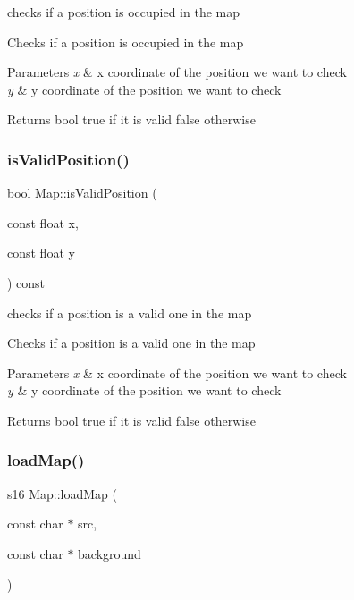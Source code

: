 checks if a position is occupied in the map 

Checks if a position is occupied in the map


\begin{DoxyParams}{Parameters}
{\em x} & x coordinate of the position we want to check \\
\hline
{\em y} & y coordinate of the position we want to check \\
\hline
\end{DoxyParams}
\begin{DoxyReturn}{Returns}
bool true if it is valid false otherwise 
\end{DoxyReturn}
\mbox{\label{class_map_a5b5c0989800c44a2db7a00bbf40c74a6}} 
\subsubsection{\texorpdfstring{is\+Valid\+Position()}{isValidPosition()}}
{\footnotesize\ttfamily bool Map\+::is\+Valid\+Position (\begin{DoxyParamCaption}\item[{const float}]{x,  }\item[{const float}]{y }\end{DoxyParamCaption}) const}



checks if a position is a valid one in the map 

Checks if a position is a valid one in the map


\begin{DoxyParams}{Parameters}
{\em x} & x coordinate of the position we want to check \\
\hline
{\em y} & y coordinate of the position we want to check \\
\hline
\end{DoxyParams}
\begin{DoxyReturn}{Returns}
bool true if it is valid false otherwise 
\end{DoxyReturn}
\mbox{\label{class_map_a4070d04487b207e04c47b89b710c95a6}} 
\subsubsection{\texorpdfstring{load\+Map()}{loadMap()}}
{\footnotesize\ttfamily s16 Map\+::load\+Map (\begin{DoxyParamCaption}\item[{const char $\ast$}]{src,  }\item[{const char $\ast$}]{background }\end{DoxyParamCaption})}



